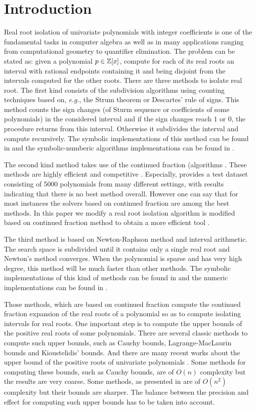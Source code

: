 
\section{Introduction }
\label{}
Real root isolation of univariate polynomials with integer coefficients is one of the fundamental tasks in computer algebra as well as in many applications ranging from computational geometry to quantifier elimination. The problem can be stated as: given a polynomial $p\in {\mathbb Z}[x]$, compute for each of its real roots an interval with rational endpoints containing it and being disjoint from the intervals
computed for the other roots.  There are three methods to isolate real root.  The first kind consists of the subdivision algorithms using counting techniques based  on, {\it e.g.}, the Strum theorem or
Descartes' rule of signs.  This  method counts the sign changes (of Sturm sequence or coefficients of some polynomials) in the considered interval and if the sign changes reach $1$ or $0$, the procedure returns from this interval.
Otherwise it subdivides the interval and compute recursively. The symbolic implementations of this method can be found in \cite{collin76,rou04} and the symbolic-numberic algorithms implementations can be found in \cite{rou04,eig05,eig08,meh11}. 

The second kind method takes use of the continued fraction (algorithms \cite{akr08,tsi08,sha08}. These methods are highly efficient and competitive \cite{rou04,akr05,hemmer09}. Especially,  \cite{hemmer09} provides a test dataset   consisting of 5000 polynomials from many
different settings,  with results indicating that there is no best method overall. However one can say that for most instances the solvers based on  continued fraction are among
the best methods. In this paper we modify a real root isolation algorithm is modified based on  continued fraction method to obtain a more efficient tool \froot.

The third method is based on Newton-Raphson method and interval arithmetic.
The search space is subdivided until it contains only a single real root and Newton's method converges. When the polynomial is sparse and has very high degree, this method will be much faster than other methods. The symbolic implementations of this kind of methods can be found in \cite{xia06,xia07} and the numeric implementations
can be found in \cite{kla93,rump99}.

Those methods, which are  based on  continued fraction compute the continued fraction expansion of the real roots of a polynomial so as to  compute isolating intervals for real roots. One important step
is to  compute the upper bounds of the positive real roots of some polynomials. There are  several classic methods to compute such upper bounds, such as Cauchy bounds, Lagrange-MacLaurin  bounds and Kioustelidis' bounds. And there are many recent works about the upper bound of the positive roots of univariate polynomials \cite{hong98,ste05,akr05,akr06,akr08}. Some methods for computing these bounds,  such as Cauchy bounds, are of $O(n)$ complexity but the results are very coarse. Some methods, as presented in  \cite{akr08} are of $O(n^2)$ complexity but their bounds are sharper. The balance between the precision and effect for computing such upper bounds has to be taken into account.

